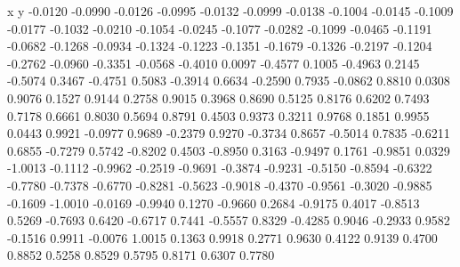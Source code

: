    x y   
   -0.0120   -0.0990
   -0.0126   -0.0995
   -0.0132   -0.0999
   -0.0138   -0.1004
   -0.0145   -0.1009
   -0.0177   -0.1032
   -0.0210   -0.1054
   -0.0245   -0.1077
   -0.0282   -0.1099
   -0.0465   -0.1191
   -0.0682   -0.1268
   -0.0934   -0.1324
   -0.1223   -0.1351
   -0.1679   -0.1326
   -0.2197   -0.1204
   -0.2762   -0.0960
   -0.3351   -0.0568
   -0.4010    0.0097
   -0.4577    0.1005
   -0.4963    0.2145
   -0.5074    0.3467
   -0.4751    0.5083
   -0.3914    0.6634
   -0.2590    0.7935
   -0.0862    0.8810
    0.0308    0.9076
    0.1527    0.9144
    0.2758    0.9015
    0.3968    0.8690
    0.5125    0.8176
    0.6202    0.7493
    0.7178    0.6661
    0.8030    0.5694
    0.8791    0.4503
    0.9373    0.3211
    0.9768    0.1851
    0.9955    0.0443
    0.9921   -0.0977
    0.9689   -0.2379
    0.9270   -0.3734
    0.8657   -0.5014
    0.7835   -0.6211
    0.6855   -0.7279
    0.5742   -0.8202
    0.4503   -0.8950
    0.3163   -0.9497
    0.1761   -0.9851
    0.0329   -1.0013
   -0.1112   -0.9962
   -0.2519   -0.9691
   -0.3874   -0.9231
   -0.5150   -0.8594
   -0.6322   -0.7780
   -0.7378   -0.6770
   -0.8281   -0.5623
   -0.9018   -0.4370
   -0.9561   -0.3020
   -0.9885   -0.1609
   -1.0010   -0.0169
   -0.9940    0.1270
   -0.9660    0.2684
   -0.9175    0.4017
   -0.8513    0.5269
   -0.7693    0.6420
   -0.6717    0.7441
   -0.5557    0.8329
   -0.4285    0.9046
   -0.2933    0.9582
   -0.1516    0.9911
   -0.0076    1.0015
    0.1363    0.9918
    0.2771    0.9630
    0.4122    0.9139
    0.4700    0.8852
    0.5258    0.8529
    0.5795    0.8171
    0.6307    0.7780